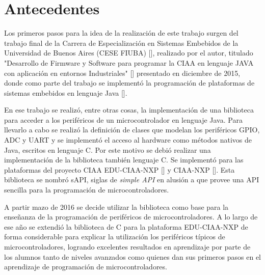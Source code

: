 \section{Antecedentes}
\label{sec:antecedentes}

Los primeros pasos para la idea de la realización de este trabajo surgen del trabajo final de la Carrera de Especialización en Sistemas Embebidos de la Universidad de Buenos Aires (CESE FIUBA) [], realizado por el autor, titulado "Desarrollo de Firmware y Software para programar la CIAA en lenguaje JAVA con aplicación en entornos Industriales" [] presentado en diciembre de 2015, donde como parte del trabajo se implementó la programación de plataformas de sistemas embebidos en lenguaje Java []. 

En ese trabajo se realizó, entre otras cosas, la implementación de una biblioteca para acceder a los periféricos de un microcontrolador en lenguaje Java. Para llevarlo a cabo se realizó la definición de clases que modelan los periféricos GPIO, ADC y UART y se implementó el acceso al hardware como métodos nativos de Java, escritos en lenguaje C. Por este motivo se debió realizar una implementación de la biblioteca también lenguaje C. 
Se implementó para las plataformas del proyecto CIAA EDU-CIAA-NXP [] y CIAA-NXP [].
Esta biblioteca se nombró sAPI, siglas de \emph{simple API} en alusión a que provee una API sencilla para la programación de microcontroladores.


A partir mazo de 2016 se decide utilizar la biblioteca como base para la enseñanza de la programación de periféricos de microcontroladores.
A lo largo de ese año se extendió la biblioteca de C para la plataforma EDU-CIAA-NXP de forma considerable para explicar la utilización los periféricos típicos de microcontroladores, logrando excelentes resultados en aprendizaje por parte de los alumnos tanto de niveles avanzados como quienes dan sus primeros pasos en el aprendizaje de programación de microcontroladores.

